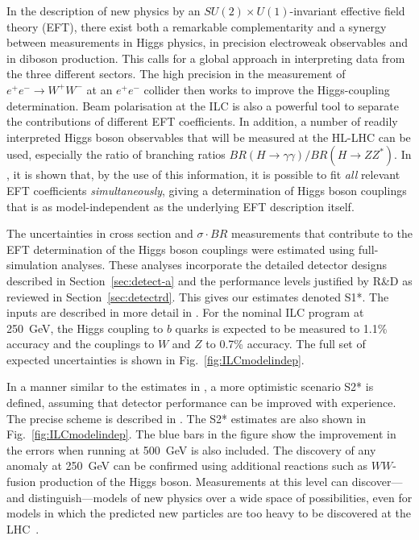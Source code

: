 \documentclass[%
 reprint,
 amsmath,amssymb,
 aps,
]{revtex4-1}
\begin{document}
In the description of new physics by an $SU(2)\times U(1)$-invariant effective field theory (EFT), there exist both a remarkable complementarity and a synergy between measurements in Higgs physics, in precision electroweak observables and in diboson production. This calls for a global approach in interpreting data from the three different sectors. The high precision in  the measurement of $e^+e^- \to W^+W^-$ at an $e^+e^-$ collider then works to improve the Higgs-coupling determination. Beam polarisation at the ILC is also a powerful tool
to separate the contributions of different EFT
coefficients.  In addition, a number of readily interpreted Higgs boson observables that will be measured at the HL-LHC can be used, especially the 
ratio of branching ratios  $BR(H\to \gamma\gamma)/BR(H\to ZZ^*)$. 
  In \cite{Barklow:2017suo}, it is shown that, by the use of this information, 
  it is possible to fit {\it all}
relevant EFT
coefficients  {\it simultaneously}, giving a 
determination of Higgs boson couplings that is as
model-independent as the underlying EFT description itself. 

 
The uncertainties in  cross section and $\sigma\cdot BR$ measurements that contribute to the EFT determination of the Higgs boson couplings were estimated using full-simulation analyses.  These analyses incorporate the detailed detector designs described in Section~\ref{sec:detect-a}
and the performance levels justified by R\&D as reviewed in Section~\ref{sec:detectrd}.
This gives our estimates denoted S1*.  The inputs are described in more detail in \cite{ILCforESS}. 
For the nominal ILC program at 250~GeV, the Higgs
coupling to $b$ quarks is expected to be measured to 1.1\% accuracy and the
couplings to $W$ and $Z$ to 0.7\% accuracy. 
The full set  of  expected
uncertainties  is shown in Fig.~\ref{fig:ILCmodelindep}. 

In a manner similar to the estimates in \cite{Yellow}, a more optimistic scenario S2* is defined, assuming that detector performance can be improved with experience.   The precise scheme is described in \cite{ILCforESS}.   The S2* estimates are also shown in Fig.~\ref{fig:ILCmodelindep}.   The blue bars in the figure show the improvement in the errors when running at 500~GeV is also included.    The 
discovery of any anomaly at 250~GeV can be confirmed 
using additional reactions  such as $WW$-fusion production of the
Higgs boson.   Measurements at this
level can discover---and distinguish---models of new physics over a
wide space of possibilities, even for models in which the predicted new
particles are too heavy to be discovered at the
LHC~\cite{Barklow:2017suo}.
\end{document}
